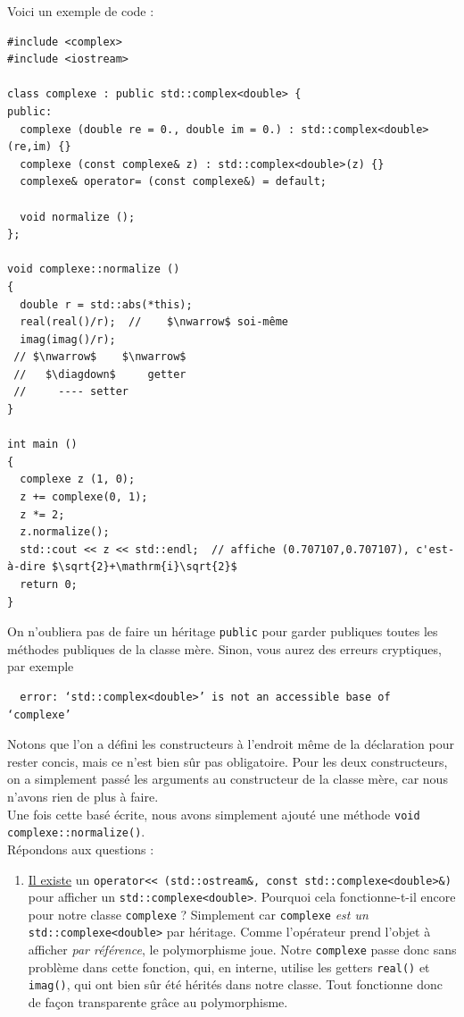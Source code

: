 \documentclass{book}
\newcommand{\inline}[1]{\texttt{#1}}
\renewenvironment{correction}{}{}
\begin{document}
\begin{correction}

Voici un exemple de code :

\begin{verbatim}
#include <complex>
#include <iostream>

class complexe : public std::complex<double> {
public:
  complexe (double re = 0., double im = 0.) : std::complex<double>(re,im) {}
  complexe (const complexe& z) : std::complex<double>(z) {}
  complexe& operator= (const complexe&) = default;

  void normalize ();
};

void complexe::normalize ()
{
  double r = std::abs(*this);
  real(real()/r);  //    $\nwarrow$ soi-même
  imag(imag()/r);
 // $\nwarrow$    $\nwarrow$
 //   $\diagdown$     getter
 //     ---- setter  
}

int main ()
{
  complexe z (1, 0);
  z += complexe(0, 1);
  z *= 2;
  z.normalize();
  std::cout << z << std::endl;  // affiche (0.707107,0.707107), c'est-à-dire $\sqrt{2}+\mathrm{i}\sqrt{2}$
  return 0;
}
\end{verbatim}

On n'oubliera pas de faire un héritage \inline{public} pour garder publiques toutes les méthodes publiques de la classe mère. Sinon, vous aurez des erreurs cryptiques, par exemple
\begin{verbatim}
  error: ‘std::complex<double>’ is not an accessible base of ‘complexe’
\end{verbatim}

Notons que l'on a défini les constructeurs à l'endroit même de la déclaration pour rester concis, mais ce n'est bien sûr pas obligatoire. Pour les deux constructeurs, on a simplement passé les arguments au constructeur de la classe mère, car nous n'avons rien de plus à faire.\\

Une fois cette basé écrite, nous avons simplement ajouté une méthode \inline{void complexe::normalize()}.\\

Répondons aux questions :
\begin{enumerate}

  \item \href{https://en.cppreference.com/w/cpp/numeric/complex/operator_ltltgtgt}{Il existe} un \inline{operator<< (std::ostream&, const std::complexe<double>&)} pour afficher un \inline{std::complexe<double>}. Pourquoi cela fonctionne-t-il encore pour notre classe \inline{complexe} ? Simplement car \inline{complexe} \emph{est un} \inline{std::complexe<double>} par héritage. Comme l'opérateur prend l'objet à afficher \emph{par référence}, le polymorphisme joue. Notre \inline{complexe} passe donc sans problème dans cette fonction, qui, en interne, utilise les getters \inline{real()} et \inline{imag()}, qui ont bien sûr été hérités dans notre classe. Tout fonctionne donc de façon transparente grâce au polymorphisme.


\end{enumerate}
\end{correction}
\end{document}
